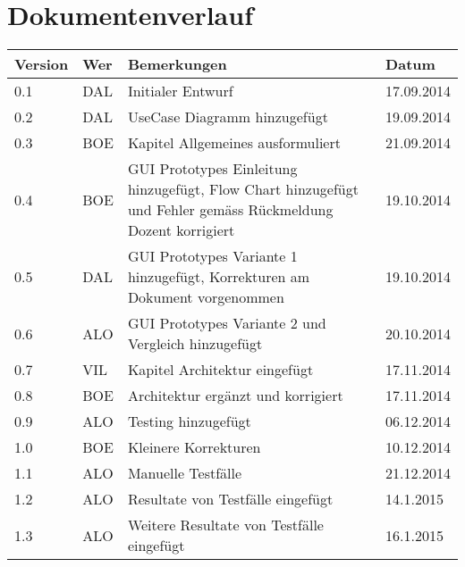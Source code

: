 \newpage
\section*{Dokumentenverlauf}
\begin{center}
	\begin{tabular}{  llp{9cm}l }
		\textbf{Version} & \textbf{Wer} & \textbf{Bemerkungen} & \textbf{Datum} \\\hline
		0.1 & DAL & Initialer Entwurf & 17.09.2014 \\
		0.2 & DAL & UseCase Diagramm hinzugefügt & 19.09.2014 \\
		0.3 & BOE & Kapitel Allgemeines ausformuliert & 21.09.2014 \\
		0.4 & BOE & GUI Prototypes Einleitung hinzugefügt, Flow Chart hinzugefügt und Fehler gemäss Rückmeldung Dozent korrigiert & 19.10.2014 \\
		0.5 & DAL & GUI Prototypes Variante 1 hinzugefügt, Korrekturen am Dokument vorgenommen & 19.10.2014 \\
		0.6 & ALO & GUI Prototypes Variante 2 und Vergleich hinzugefügt & 20.10.2014 \\
		0.7 & VIL & Kapitel Architektur eingefügt & 17.11.2014 \\
		0.8 & BOE & Architektur ergänzt und korrigiert & 17.11.2014 \\
		0.9 & ALO & Testing hinzugefügt & 06.12.2014 \\
		1.0 & BOE & Kleinere Korrekturen & 10.12.2014 \\
		1.1 & ALO & Manuelle Testfälle & 21.12.2014 \\
		1.2 & ALO & Resultate von Testfälle eingefügt & 14.1.2015 \\
		1.3 & ALO & Weitere Resultate von Testfälle eingefügt & 16.1.2015 \\
	\end{tabular}
\end{center}
\newpage